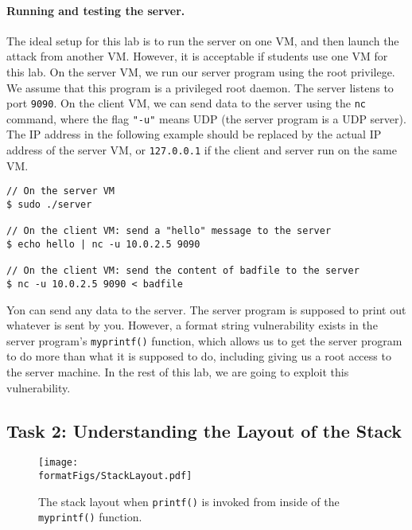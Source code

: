 \paragraph{Running and testing the server.} The ideal setup for this lab is
to run the server on one VM, and then launch the attack from another VM.
However, it is acceptable if students use one VM for this lab.
On the server VM, we run our server program using the root privilege. We
assume that this program is a privileged root daemon. The server listens to
port \texttt{9090}. On the client VM, we can send data to the server using 
the \texttt{nc} command, where the flag \texttt{"-u"} means UDP (the server
program is a UDP server). The IP address in the following example should be 
replaced by the actual IP address of the server VM, or \texttt{127.0.0.1}
if the client and server run on the same VM. 

\begin{lstlisting}
// On the server VM
$ sudo ./server

// On the client VM: send a "hello" message to the server
$ echo hello | nc -u 10.0.2.5 9090

// On the client VM: send the content of badfile to the server
$ nc -u 10.0.2.5 9090 < badfile
\end{lstlisting}

Yon can send any data to the server. The server program is supposed
to print out whatever is sent by you. However, 
a format string vulnerability exists in the server program's
\texttt{myprintf()} function, which allows us to get the server program to
do more than what it is supposed to do, including giving us a root access to the
server machine. In the rest of this lab, we are going to
exploit this vulnerability.
 

\subsection{Task 2: Understanding the Layout of the Stack}


\begin{figure}[htb]
\begin{center}
\texttt{[image: \\formatFigs/StackLayout.pdf]}
\end{center}
\caption{The stack layout when \texttt{printf()} is invoked 
from inside of the \texttt{myprintf()} function.}
\label{format:fig:stacklayout}
\end{figure}
 


